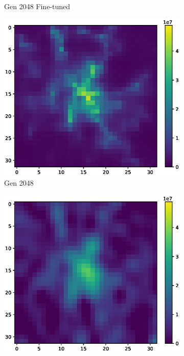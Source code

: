 \begin{figure}
\begin{subfigure}[b]{0.32\textwidth}
        \caption{Gen 2048 Fine-tuned}
    \end{subfigure}
    \begin{subfigure}[b]{0.32\textwidth}
        \includegraphics[width=\textwidth]{figures/06_results/gaussian_plume_example/munich/gen_2048_40_db.eps}
        \caption{Gen 2048}
    \end{subfigure}
    \begin{subfigure}[b]{0.32\textwidth}
        \includegraphics[width=\textwidth]{figures/06_results/gaussian_plume_example/munich/bp_dct_snr_40_db.eps}

\end{subfigure}
\end{figure}
